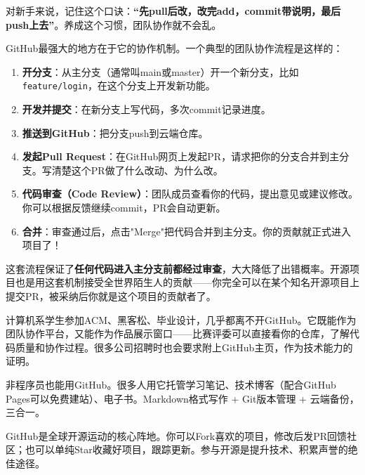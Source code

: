 对新手来说，记住这个口诀：\textbf{“先pull后改，改完add，commit带说明，最后push上去”}。养成这个习惯，团队协作就不会乱。


GitHub最强大的地方在于它的协作机制。一个典型的团队协作流程是这样的：

\begin{enumerate}
  \item \textbf{开分支}：从主分支（通常叫main或master）开一个新分支，比如\texttt{feature/\allowbreak login}，在这个分支上开发新功能。
  \item \textbf{开发并提交}：在新分支上写代码，多次commit记录进度。
  \item \textbf{推送到GitHub}：把分支push到云端仓库。
  \item \textbf{发起Pull Request}：在GitHub网页上发起PR，请求把你的分支合并到主分支。写清楚这个PR做了什么改动、为什么改。
  \item \textbf{代码审查（Code Review）}：团队成员查看你的代码，提出意见或建议修改。你可以根据反馈继续commit，PR会自动更新。
  \item \textbf{合并}：审查通过后，点击"Merge"把代码合并到主分支。你的贡献就正式进入项目了！
\end{enumerate}

这套流程保证了\textbf{任何代码进入主分支前都经过审查}，大大降低了出错概率。开源项目也是用这套机制接受全世界陌生人的贡献——你完全可以在某个知名开源项目上提交PR，被采纳后你就是这个项目的贡献者了。



计算机系学生参加ACM、黑客松、毕业设计，几乎都离不开GitHub。它既能作为团队协作平台，又能作为作品展示窗口——比赛评委可以直接看你的仓库，了解代码质量和协作过程。很多公司招聘时也会要求附上GitHub主页，作为技术能力的证明。


非程序员也能用GitHub。很多人用它托管学习笔记、技术博客（配合GitHub Pages可以免费建站）、电子书。Markdown格式写作 + Git版本管理 + 云端备份，三合一。


GitHub是全球开源运动的核心阵地。你可以Fork喜欢的项目，修改后发PR回馈社区；也可以单纯Star收藏好项目，跟踪更新。参与开源是提升技术、积累声誉的绝佳途径。


